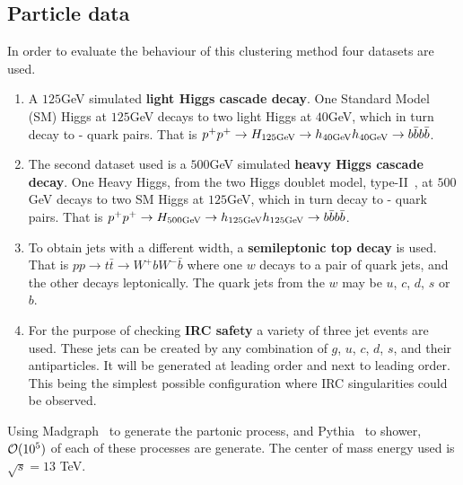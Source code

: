     \subsection{Particle data}\label{sec:particle_data}

    In order to evaluate the behaviour of this clustering method four datasets are used.

    \begin{enumerate}
        \item A \(125\)GeV simulated \textbf{light Higgs cascade decay}.
    One Standard Model (SM) Higgs at \(125\)GeV decays to two light Higgs at \(40\)GeV,
    which in turn decay to \beau{}-\bbar{} quark pairs.
    That is \(p^+ p^+ \rightarrow H_{125\text{GeV}} \rightarrow h_{40\text{GeV}} h_{40\text{GeV}} \rightarrow b \bar{b} b \bar{b}\).

\item The second dataset used is a \(500\)GeV simulated \textbf{heavy Higgs cascade decay}.
         One Heavy Higgs, from the two Higgs doublet model, type-II~\cite{2hdm_modelfile}, at \(500\)GeV decays to two SM Higgs at \(125\)GeV,
    which in turn decay to \beau{}-\bbar{} quark pairs.
    That is \(p^+ p^+ \rightarrow H_{500\text{GeV}} \rightarrow h_{125\text{GeV}} h_{125\text{GeV}} \rightarrow b \bar{b} b \bar{b}\).

\item To obtain jets with a different width, a \textbf{semileptonic top decay} is used.
        That is \( p p \rightarrow t \bar{t} \rightarrow W^+ b W^- \bar{b} \)  where one \(w\) decays to a pair of quark jets, and the other decays leptonically.
        The quark jets from the \(w\) may be \(u\), \(c\), \(d\), \(s\) or \(b\).
        

    \item For the purpose of checking \textbf{IRC safety} a variety of three jet events are used.
        These jets can be created by any combination of \(g\), \(u\), \(c\), \(d\), \(s\), and their antiparticles.
        It will be generated at leading order and next to leading order.
        This being the simplest possible configuration where IRC singularities could be observed.

    \end{enumerate}

    Using Madgraph~\cite{alwall_madgraph2011} to generate the partonic process, and Pythia~\cite{sjostrand_pythia2015} to shower, ${\cal O}(10^5)$ of each of these processes are generate.
    The center of mass energy used is \(\sqrt{s}=13 \) TeV.


